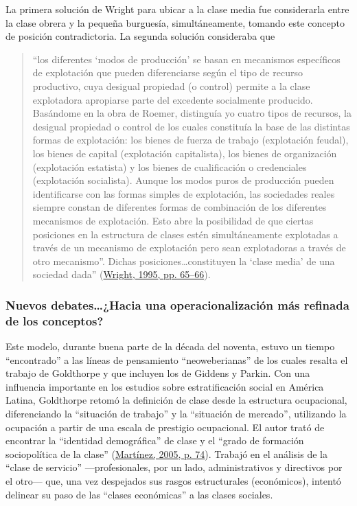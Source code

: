 \documentclass[
]{article}
\begin{document}
La primera solución de Wright para ubicar a la clase media fue considerarla entre la clase obrera y la pequeña burguesía, simultáneamente, tomando este concepto de posición contradictoria. La segunda solución consideraba que

\begin{quote}
``los diferentes `modos de producción' se basan en mecanismos específicos de explotación que pueden diferenciarse según el tipo de recurso productivo, cuya desigual propiedad (o control) permite a la clase explotadora apropiarse parte del excedente socialmente producido. Basándome en la obra de Roemer, distinguía yo cuatro tipos de recursos, la desigual propiedad o control de los cuales constituía la base de las distintas formas de explotación: los bienes de fuerza de trabajo (explotación feudal), los bienes de capital (explotación capitalista), los bienes de organización (explotación estatista) y los bienes de cualificación o credenciales (explotación socialista). Aunque los modos puros de producción pueden identificarse con las formas simples de explotación, las sociedades reales siempre constan de diferentes formas de combinación de los diferentes mecanismos de explotación. Esto abre la posibilidad de que ciertas posiciones en la estructura de clases estén simultáneamente explotadas a través de un mecanismo de explotación pero sean explotadoras a través de otro mecanismo''. Dichas posiciones\ldots constituyen la `clase media' de una sociedad dada'' (\protect\hyperlink{ref-Wright1995a}{Wright, 1995, pp. 65--66}).
\end{quote}

\hypertarget{nuevos-debateshacia-una-operacionalizaciuxf3n-muxe1s-refinada-de-los-conceptos}{%
\subsubsection{Nuevos debates\ldots¿Hacia una operacionalización más refinada de los conceptos?}\label{nuevos-debateshacia-una-operacionalizaciuxf3n-muxe1s-refinada-de-los-conceptos}}

Este modelo, durante buena parte de la década del noventa, estuvo un tiempo ``encontrado'' a las líneas de pensamiento ``neoweberianas'' de los cuales resalta el trabajo de Goldthorpe y que incluyen los de Giddens y Parkin. Con una influencia importante en los estudios sobre estratificación social en América Latina, Goldthorpe retomó la definición de clase desde la estructura ocupacional, diferenciando la ``situación de trabajo'' y la ``situación de mercado'', utilizando la ocupación a partir de una escala de prestigio ocupacional. El autor trató de encontrar la ``identidad demográfica'' de clase y el ``grado de formación sociopolítica de la clase'' (\protect\hyperlink{ref-Martinez2005}{Martínez, 2005, p. 74}). Trabajó en el análisis de la ``clase de servicio'' ---profesionales, por un lado, administrativos y directivos por el otro--- que, una vez despejados sus rasgos estructurales (económicos), intentó delinear su paso de las ``clases económicas'' a las clases sociales.
\end{document}
